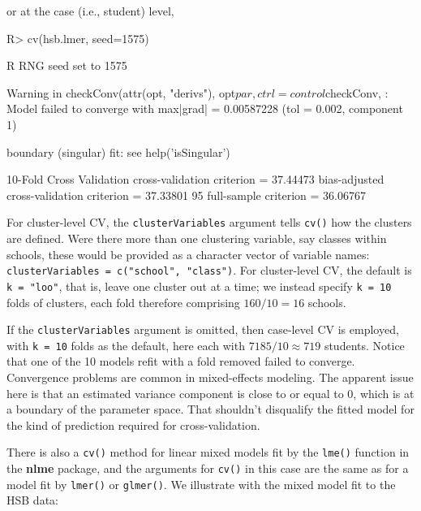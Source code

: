 \documentclass[
]{jss}
\begin{document}
or at the case (i.e., student) level,

\begin{CodeChunk}
\begin{CodeInput}
R> cv(hsb.lmer, seed=1575)
\end{CodeInput}
\begin{CodeOutput}
R RNG seed set to 1575
\end{CodeOutput}
\begin{CodeOutput}
Warning in checkConv(attr(opt, "derivs"), opt$par, ctrl = control$checkConv, :
Model failed to converge with max|grad| = 0.00587228 (tol = 0.002, component 1)
\end{CodeOutput}
\begin{CodeOutput}
boundary (singular) fit: see help('isSingular')
\end{CodeOutput}
\begin{CodeOutput}
10-Fold Cross Validation
cross-validation criterion = 37.44473
bias-adjusted cross-validation criterion = 37.33801
95%
full-sample criterion = 36.06767 
\end{CodeOutput}
\end{CodeChunk}

For cluster-level CV, the \texttt{clusterVariables} argument tells
\texttt{cv()} how the clusters are defined. Were there more than one
clustering variable, say classes within schools, these would be provided
as a character vector of variable names:
\texttt{clusterVariables\ =\ c("school",\ "class")}. For cluster-level
CV, the default is \texttt{k\ =\ "loo"}, that is, leave one cluster out
at a time; we instead specify \texttt{k\ =\ 10} folds of clusters, each
fold therefore comprising \(160/10 = 16\) schools.

If the \texttt{clusterVariables} argument is omitted, then case-level CV
is employed, with \texttt{k\ =\ 10} folds as the default, here each with
\(7185/10 \approx 719\) students. Notice that one of the 10 models refit
with a fold removed failed to converge. Convergence problems are common
in mixed-effects modeling. The apparent issue here is that an estimated
variance component is close to or equal to 0, which is at a boundary of
the parameter space. That shouldn't disqualify the fitted model for the
kind of prediction required for cross-validation.

There is also a \texttt{cv()} method for linear mixed models fit by the
\texttt{lme()} function in the \textbf{nlme} package, and the arguments
for \texttt{cv()} in this case are the same as for a model fit by
\texttt{lmer()} or \texttt{glmer()}. We illustrate with the mixed model
fit to the HSB data:
\end{document}
